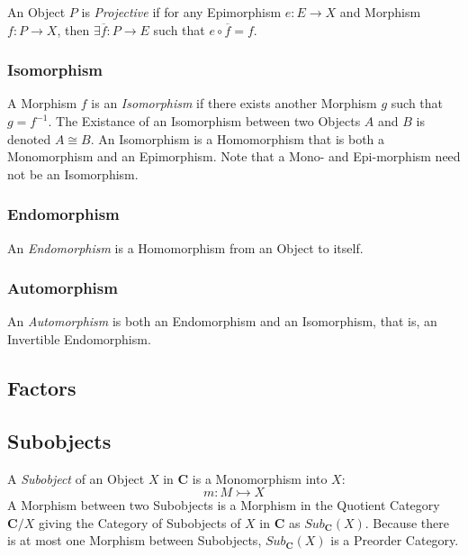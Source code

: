 An Object $P$ is \emph{Projective} if for any Epimorphism $e : E
\rightarrow X$ and Morphism $f : P \rightarrow X$, then $\exists
\overline{f} : P \rightarrow E$ such that $e \circ \overline{f} = f$.

\subsubsection{Isomorphism}\label{subsec:isomorphism}

A Morphism $f$ is an \emph{Isomorphism} if there exists another
Morphism $g$ such that $g = f^{-1}$. The Existance of an Isomorphism
between two Objects $A$ and $B$ is denoted $A \cong B$. An Isomorphism
is a Homomorphism that is both a Monomorphism and an Epimorphism. Note
that a Mono- and Epi-morphism need not be an Isomorphism.

\subsubsection{Endomorphism}

An \emph{Endomorphism} is a Homomorphism from an Object to itself.

\subsubsection{Automorphism}\label{subsec:automorphism}

An \emph{Automorphism} is both an Endomorphism and an Isomorphism,
that is, an Invertible Endomorphism.

\subsection{Factors}\label{subsec:morphism_factor}

\subsection{Subobjects}\label{subsec:category_subobjects}

A \emph{Subobject} of an Object $X$ in $\mathbf{C}$ is a Monomorphism
into $X$:
\[
    m : M \rightarrowtail X
\]
A Morphism between two Subobjects is a Morphism in the Quotient
Category $\mathbf{C}/X$ giving the Category of Subobjects of $X$ in
$\mathbf{C}$ as $Sub_{\mathbf{C}}(X)$. Because there is at most one
Morphism between Subobjects, $Sub_{\mathbf{C}}(X)$ is a Preorder
Category.

